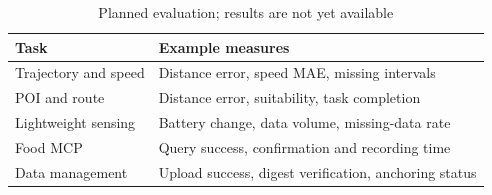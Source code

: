 \begin{table}[t]
\caption{Planned evaluation; results are not yet available}
\label{tab:comparison}
\centering
\begin{tabular}{p{}p{}}
\toprule
Task & Example measures \\
\midrule
Trajectory and speed & Distance error, speed MAE, missing intervals \\
POI and route & Distance error, suitability, task completion \\
Lightweight sensing & Battery change, data volume, missing-data rate \\
Food MCP & Query success, confirmation and recording time \\
Data management & Upload success, digest verification, anchoring status \\
\bottomrule
\end{tabular}
\end{table}
